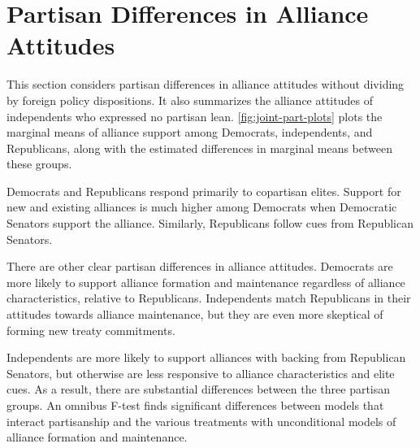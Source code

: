 \documentclass[12pt]{article}
\begin{document}
\newpage 



\section{Partisan Differences in Alliance Attitudes}

This section considers partisan differences in alliance attitudes without dividing by foreign policy dispositions. 
It also summarizes the alliance attitudes of independents who expressed no partisan lean. 
\autoref{fig:joint-part-plots} plots the marginal means of alliance support among Democrats, independents, and Republicans, along with the estimated differences in marginal means between these groups. 


Democrats and Republicans respond primarily to copartisan elites.
Support for new and existing alliances is much higher among Democrats when Democratic Senators support the alliance.
Similarly, Republicans follow cues from Republican Senators.


There are other clear partisan differences in alliance attitudes.
Democrats are more likely to support alliance formation and maintenance regardless of alliance characteristics, relative to Republicans. 
Independents match Republicans in their attitudes towards alliance maintenance, but they are even more skeptical of forming new treaty commitments. 


Independents are more likely to support alliances with backing from Republican Senators, but otherwise are less responsive to alliance characteristics and elite cues. 
As a result, there are substantial differences between the three partisan groups. 
An omnibus F-test finds significant differences between models that interact partisanship and the various treatments with unconditional models of alliance formation and maintenance. 
\end{document}
